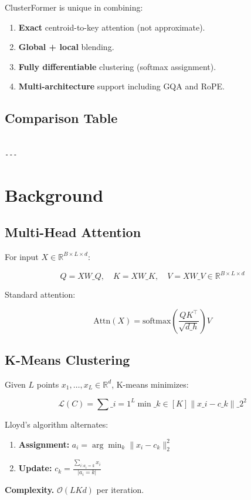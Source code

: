 ClusterFormer is unique in combining:
\begin{enumerate}
\item \textbf{Exact} centroid-to-key attention (not approximate).
\item \textbf{Global + local} blending.
\item \textbf{Fully differentiable} clustering (softmax assignment).
\item \textbf{Multi-architecture} support including GQA and RoPE.

\end{enumerate}
\subsection{Comparison Table}

\begin{lstlisting}

---
\end{lstlisting}

\section{Background}

\subsection{Multi-Head Attention}

For input $X \in \mathbb{R}^{B \times L \times d}$:

\[
Q = X W\_Q, \quad K = X W\_K, \quad V = X W\_V \in \mathbb{R}^{B \times L \times d}
\]

Standard attention:

\[
\text{Attn}(X) = \text{softmax}\!\left(\frac{Q K^\top}{\sqrt{d\_h}}\right) V
\]

\subsection{K-Means Clustering}

Given $L$ points $x_1, \dots, x_L \in \mathbb{R}^d$, K-means minimizes:

\[
\mathcal{L}(C) = \sum\_{i=1}^{L} \min\_{k \in [K]} \|x\_i - c\_k\|\_2^2
\]

Lloyd's algorithm alternates:

\begin{enumerate}
\item \textbf{Assignment:} $a_i = \arg\min_k \|x_i - c_k\|_2^2$
\item \textbf{Update:} $c_k = \frac{\sum_{i: a_i = k} x_i}{|a_i = k|}$

\end{enumerate}
\textbf{Complexity.} $\mathcal{O}(L K d)$ per iteration.

